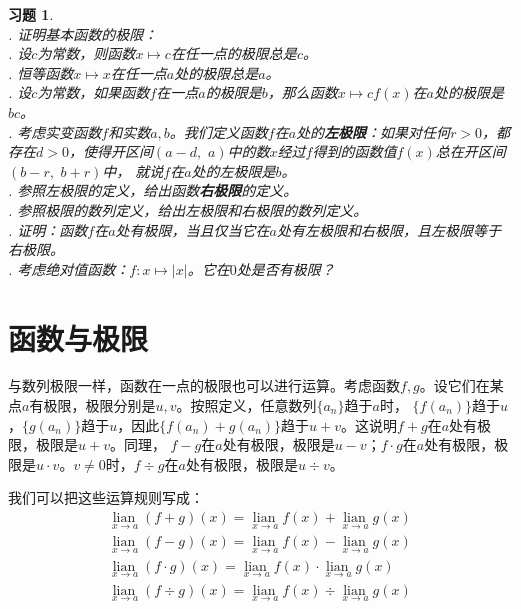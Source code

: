 \documentclass[12pt,UTF8]{ctexbook}
\newcommand\lian[1]{
    \underset{#1}{\operatorname{lian}\,}
}
\newtheorem{xt}{习题}[section]
\begin{document}
\begin{xt}
    \mbox{} \\
    . 证明基本函数的极限：\\
    . 设$c$为常数，则函数$x\mapsto c$在任一点的极限总是$c$。\\
    . 恒等函数$x\mapsto x$在任一点$a$处的极限总是$a$。\\
    . 设$c$为常数，如果函数$f$在一点$a$的极限是$b$，那么函数$x\mapsto cf(x)$在$a$处的极限是$bc$。\\
    . 考虑实变函数$f$和实数$a, b$。我们定义函数$f$在$a$处的\textbf{左极限}：如果对任何$r>0$，都存在$d>0$，使得开区间$(a-d,\,\,a)$中的数$x$经过$f$得到的函数值$f(x)$总在开区间$(b-r,\,\,b+r)$中，
    就说$f$在$a$处的左极限是$b$。\\
    . 参照左极限的定义，给出函数\textbf{右极限}的定义。\\
    . 参照极限的数列定义，给出左极限和右极限的数列定义。\\
    . 证明：函数$f$在$a$处有极限，当且仅当它在$a$处有左极限和右极限，且左极限等于右极限。\\
    . 考虑绝对值函数：$f:x\mapsto |x|$。它在$0$处是否有极限？
\end{xt}

\section{函数与极限}
与数列极限一样，函数在一点的极限也可以进行运算。考虑函数$f,g$。设它们在某点$a$有极限，极限分别是$u, v$。按照定义，任意数列$\{a_n\}$趋于$a$时，
$\{f(a_n)\}$趋于$u$，$\{g(a_n)\}$趋于$u$，因此$\{f(a_n) + g(a_n)\}$趋于$u + v$。这说明$f + g$在$a$处有极限，极限是$u + v$。同理，
$f - g$在$a$处有极限，极限是$u - v$；$f \cdot g$在$a$处有极限，极限是$u \cdot v$。$v\neq 0$时，$f\div g$在$a$处有极限，极限是$u \div v$。

我们可以把这些运算规则写成：
\begin{align*}
    \lian{x \to a} (f + g)(x) = \lian{x \to a} f(x) + \lian{x \to a} g(x)  \\
    \lian{x \to a} (f - g)(x) = \lian{x \to a} f(x) - \lian{x \to a} g(x)  \\
    \lian{x \to a} (f \cdot g)(x) = \lian{x \to a} f(x) \cdot \lian{x \to a} g(x)  \\
    \lian{x \to a} (f \div g)(x) = \lian{x \to a} f(x) \div \lian{x \to a} g(x) 
\end{align*}
\end{document}
